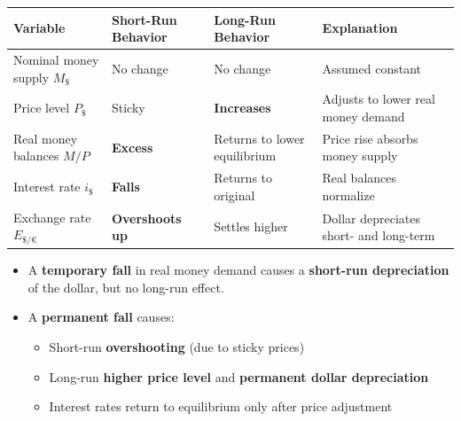 \documentclass[
]{article}
\providecommand{\tightlist}{%
  \setlength{\itemsep}{0pt}\setlength{\parskip}{0pt}}
\begin{document}
\begin{longtable}[]{@{}
  >{\raggedright\arraybackslash}p{}
  >{\raggedright\arraybackslash}p{}
  >{\raggedright\arraybackslash}p{}
  >{\raggedright\arraybackslash}p{}@{}}
\toprule\noalign{}
\begin{minipage}[b]{\linewidth}\raggedright
Variable
\end{minipage} & \begin{minipage}[b]{\linewidth}\raggedright
Short-Run Behavior
\end{minipage} & \begin{minipage}[b]{\linewidth}\raggedright
Long-Run Behavior
\end{minipage} & \begin{minipage}[b]{\linewidth}\raggedright
Explanation
\end{minipage} \\
\midrule\noalign{}
\endhead
\bottomrule\noalign{}
\endlastfoot
Nominal money supply \(M_{\$}\) & No change & No change & Assumed
constant \\
Price level \(P_{\$}\) & Sticky & \textbf{Increases} & Adjusts to lower
real money demand \\
Real money balances \(M/P\) & \textbf{Excess} & Returns to lower
equilibrium & Price rise absorbs money supply \\
Interest rate \(i_{\$}\) & \textbf{Falls} & Returns to original & Real
balances normalize \\
Exchange rate \(E_{\$/€}\) & \textbf{Overshoots up} & Settles higher &
Dollar depreciates short- and long-term \\
\end{longtable}

\begin{itemize}
\tightlist
\item
  A \textbf{temporary fall} in real money demand causes a
  \textbf{short-run depreciation} of the dollar, but no long-run effect.
\item
  A \textbf{permanent fall} causes:

  \begin{itemize}
  \tightlist
  \item
    Short-run \textbf{overshooting} (due to sticky prices)
  \item
    Long-run \textbf{higher price level} and \textbf{permanent dollar
    depreciation}
  \item
    Interest rates return to equilibrium only after price adjustment
  \end{itemize}
\end{itemize}
\end{document}
